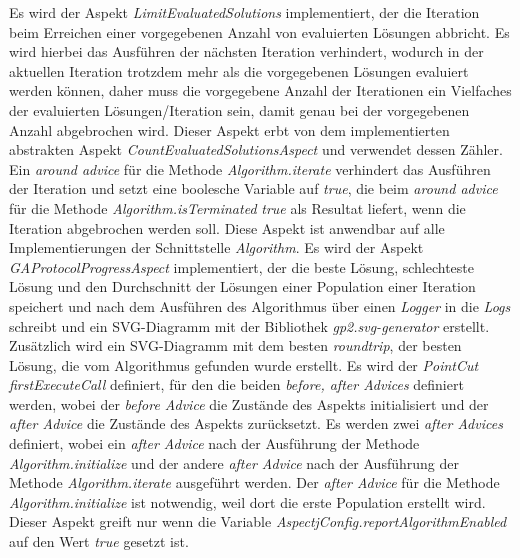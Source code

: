\documentclass[11pt, a4paper, twoside]{article}   	%
\begin{document}
\newline
\newline
Es wird der Aspekt \emph{LimitEvaluatedSolutions} implementiert, der die Iteration beim Erreichen einer vorgegebenen Anzahl von evaluierten Lösungen abbricht. Es wird hierbei das Ausführen der nächsten Iteration verhindert, wodurch in der aktuellen Iteration trotzdem mehr als die vorgegebenen Lösungen evaluiert werden können, daher muss die vorgegebene Anzahl der Iterationen ein Vielfaches der evaluierten Lösungen/Iteration sein, damit genau bei der vorgegebenen Anzahl abgebrochen wird. Dieser Aspekt erbt von dem implementierten abstrakten Aspekt \emph{CountEvaluatedSolutionsAspect} und verwendet dessen Zähler. Ein \emph{around advice} für die Methode \emph{Algorithm.iterate} verhindert das Ausführen der Iteration und setzt eine boolesche Variable auf \emph{true}, die beim \emph{around advice} für die Methode \emph{Algorithm.isTerminated} \emph{true} als Resultat liefert, wenn die Iteration abgebrochen werden soll. Diese Aspekt ist anwendbar auf alle Implementierungen der Schnittstelle \emph{Algorithm}.
\newline
\newline
Es wird der Aspekt \emph{GAProtocolProgressAspect} implementiert, der die beste Lösung, schlechteste Lösung und den Durchschnitt der Lösungen einer Population einer Iteration speichert und nach dem Ausführen des Algorithmus über einen \emph{Logger} in die \emph{Logs} schreibt und ein SVG-Diagramm mit der Bibliothek \emph{gp2.svg-generator} erstellt. Zusätzlich wird ein SVG-Diagramm mit dem besten \emph{roundtrip}, der besten Lösung, die vom Algorithmus gefunden wurde erstellt. Es wird der \emph{PointCut firstExecuteCall} definiert, für den die beiden \emph{before, after Advices} definiert werden, wobei der \emph{before Advice} die Zustände des Aspekts initialisiert und der \emph{after Advice} die Zustände des Aspekts zurücksetzt. Es werden zwei \emph{after Advices} definiert, wobei ein \emph{after Advice} nach der Ausführung der Methode \emph{Algorithm.initialize} und der andere \emph{after Advice} nach der Ausführung der Methode \emph{Algorithm.iterate} ausgeführt werden. Der \emph{after Advice} für die Methode \emph{Algorithm.initialize} ist notwendig, weil dort die erste Population erstellt wird. Dieser Aspekt greift nur wenn die Variable \emph{AspectjConfig.reportAlgorithmEnabled} auf den Wert \emph{true} gesetzt ist.
\newline
\newline
\end{document}

